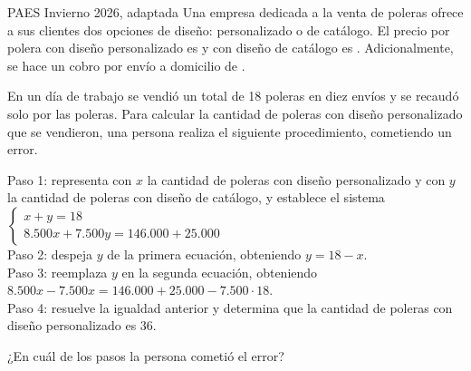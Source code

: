 \begin{elejemplo}{PAES Invierno 2026, adaptada}
Una empresa dedicada a la venta de poleras ofrece a sus clientes dos opciones de diseño: personalizado o de catálogo. El precio por polera con diseño personalizado es  y con diseño de catálogo es . Adicionalmente, se hace un cobro por envío a domicilio de .

En un día de trabajo se vendió un total de 18 poleras en diez envíos y se recaudó  solo por las poleras. Para calcular la cantidad de poleras con diseño personalizado que se vendieron, una persona realiza el siguiente procedimiento, cometiendo un error.

Paso 1: representa con $x$ la cantidad de poleras con diseño personalizado y con $y$ la cantidad de poleras con diseño de catálogo, y establece el sistema $\begin{cases} x + y = 18 \\ 8.500x + 7.500y = 146.000 + 25.000 \end{cases}$\\[2pt]
Paso 2: despeja $y$ de la primera ecuación, obteniendo $y = 18 - x$.\\
Paso 3: reemplaza $y$ en la segunda ecuación, obteniendo $8.500x - 7.500x = 146.000 + 25.000 - 7.500\cdot 18$.\\
Paso 4: resuelve la igualdad anterior y determina que la cantidad de poleras con diseño personalizado es 36.

¿En cuál de los pasos la persona cometió el error?
\end{elejemplo}

